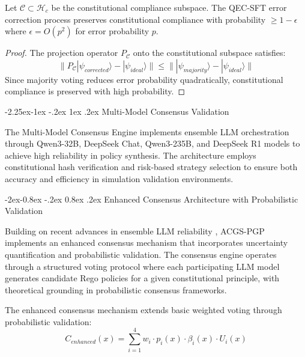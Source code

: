 \documentclass[manuscript,screen,9pt]{acmart}
\makeatletter
\renewcommand\subsection{\@startsection{subsection}{2}{\z@}%
  {-2.25ex\@plus -1ex \@minus -.2ex}%
  {1ex \@plus .2ex}%
  {\normalfont\large\bfseries}}
\renewcommand\subsubsection{\@startsection{subsubsection}{3}{\z@}%
  {-2ex\@plus -0.8ex \@minus -.2ex}%
  {0.8ex \@plus .2ex}%
  {\normalfont\normalsize\bfseries}}
\makeatother
\begin{document}
\begin{theorem}
Let $\mathcal{C} \subset \mathcal{H}_c$ be the constitutional compliance subspace. The QEC-SFT error correction process preserves constitutional compliance with probability $\geq 1 - \epsilon$ where $\epsilon = O(p^2)$ for error probability $p$.
\end{theorem}

\begin{proof}
The projection operator $P_{\mathcal{C}}$ onto the constitutional subspace satisfies:
$$\|P_{\mathcal{C}}|\psi_{corrected}\rangle - |\psi_{ideal}\rangle\| \leq \||\psi_{majority}\rangle - |\psi_{ideal}\rangle\|$$
Since majority voting reduces error probability quadratically, constitutional compliance is preserved with high probability.
\end{proof}

\subsection{Multi-Model Consensus Validation}
\label{subsec:multi_model_consensus}

The Multi-Model Consensus Engine implements ensemble LLM orchestration through Qwen3-32B, DeepSeek Chat, Qwen3-235B, and DeepSeek R1 models to achieve high reliability in policy synthesis. The architecture employs constitutional hash verification and risk-based strategy selection to ensure both accuracy and efficiency in simulation validation environments.

\subsubsection{Enhanced Consensus Architecture with Probabilistic Validation}
\label{subsubsec:enhanced_consensus}

Building on recent advances in ensemble LLM reliability \citep{Naik2024ProbabilisticConsensus}, ACGS-PGP implements an enhanced consensus mechanism that incorporates uncertainty quantification and probabilistic validation. The consensus engine operates through a structured voting protocol where each participating LLM model generates candidate Rego policies for a given constitutional principle, with theoretical grounding in probabilistic consensus frameworks.

The enhanced consensus mechanism extends basic weighted voting through probabilistic validation:
\begin{equation}
C_{enhanced}(x) = \sum_{i=1}^{4} w_i \cdot p_i(x) \cdot \beta_i(x) \cdot U_i(x)
\end{equation}
\end{document}
